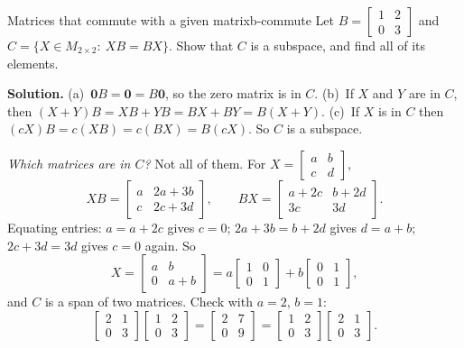 \documentclass[11pt]{article}
\begin{document}
\begin{exmp}{Matrices that commute with a given matrix}{b-commute}
Let $B=\begin{bmatrix}1&2\\0&3\end{bmatrix}$ and $C=\{X\in M_{2\times2}:\ XB=BX\}$. Show that $C$ is a subspace, and find all of its elements.

\textbf{Solution.} (a)~$\mathbf{0}B=\mathbf{0}=B\mathbf{0}$, so the zero matrix is in $C$. (b)~If $X$ and $Y$ are in $C$, then $(X+Y)B=XB+YB=BX+BY=B(X+Y)$. (c)~If $X$ is in $C$ then $(cX)B=c(XB)=c(BX)=B(cX)$. So $C$ is a subspace.

\emph{Which matrices are in $C$?} Not all of them. For $X=\begin{bmatrix}a&b\\c&d\end{bmatrix}$,
\[
XB=\begin{bmatrix}a&2a+3b\\c&2c+3d\end{bmatrix},\qquad BX=\begin{bmatrix}a+2c&b+2d\\3c&3d\end{bmatrix}.
\]
Equating entries: $a=a+2c$ gives $c=0$; $2a+3b=b+2d$ gives $d=a+b$; $2c+3d=3d$ gives $c=0$ again. So
\[
X=\begin{bmatrix}a&b\\0&a+b\end{bmatrix}=a\begin{bmatrix}1&0\\0&1\end{bmatrix}+b\begin{bmatrix}0&1\\0&1\end{bmatrix},
\]
and $C$ is a span of two matrices. Check with $a=2$, $b=1$:
\[
\begin{bmatrix}2&1\\0&3\end{bmatrix}\begin{bmatrix}1&2\\0&3\end{bmatrix}=\begin{bmatrix}2&7\\0&9\end{bmatrix}=\begin{bmatrix}1&2\\0&3\end{bmatrix}\begin{bmatrix}2&1\\0&3\end{bmatrix}.
\]
\end{exmp}
\end{document}
